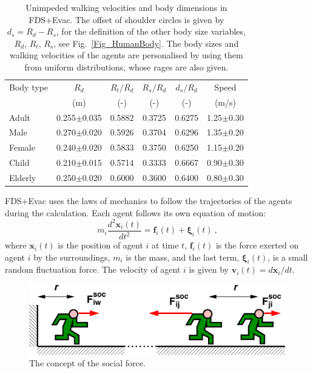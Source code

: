 \documentclass[12pt,a4paper,final,twoside]{stylevk}
\begin{document}
%
\begin{table}[b!]
\begin{center}
\caption{Unimpeded walking velocities and body dimensions in FDS+Evac.
   The offset of shoulder circles is given by $d_s = R_d - R_s$, for the
   definition of the other body size variables, $R_d$, $R_t$, $R_s$,
   see Fig.~\protect\ref{Fig_HumanBody}.  The body sizes and walking
   velocities of the agents are personalised by using them from uniform
   distributions, whose rages are also given.}\label{Table_DefaultHumans}  
\vspace{12pt}
\begin{tabular}{l c c c c c}\hline\hline 
Body type & $R_d$& $R_t/R_d$ & $R_s/R_d$  & $d_s/R_d$ & Speed \\
          & (m)  & (-)   &  (-)    & (-)    & (m/s) \\ \hline
Adult     & 0.255$\pm$0.035 & 0.5882 & 0.3725 & 0.6275 & 
          1.25$\pm$0.30 \\  %
Male      & 0.270$\pm$0.020 & 0.5926 & 0.3704 & 0.6296 &
          1.35$\pm$0.20 \\  %
Female    & 0.240$\pm$0.020 & 0.5833 & 0.3750 & 0.6250 & 
          1.15$\pm$0.20 \\  %
Child     & 0.210$\pm$0.015 & 0.5714 & 0.3333 & 0.6667 & 
          0.90$\pm$0.30 \\  %
Elderly   & 0.250$\pm$0.020 & 0.6000 & 0.3600 & 0.6400 & 
          0.80$\pm$0.30 \\ \hline\hline  %
\end{tabular}
\end{center}
\end{table}
%

FDS+Evac uses the laws of mechanics to follow the trajectories of the
agents during the calculation.  Each agent follows its own equation of
motion:
%
\begin{equation}\label{Eq_motion}
   m_i \frac{d^2 \mathbf{x}_i (t)}{dt^2} = \mathbf{f}_i (t)  +
  {\boldsymbol  \xi}_i (t) ~,  
\end{equation}
%
where $\mathbf{x}_i (t)$ is the position of agent $i$ at time $t$,
$\mathbf{f}_i (t)$ is the force exerted on agent $i$ by the
surroundings, $m_i$ is the mass, and the last term, ${\boldsymbol
  \xi}_i (t)$, is a small random fluctuation force.  The velocity of
agent $i$ is given by $\mathbf{v}_i (t) = d\mathbf{x}_i/dt$.

%
\begin{figure}[tb]
  \centerline{\includegraphics[clip=true, width=120mm]{FIGURES/voimakuvat_Poster}}
  \caption{The concept of the social force.}\label{Fig_SocForce}
\end{figure}
%
\end{document}
